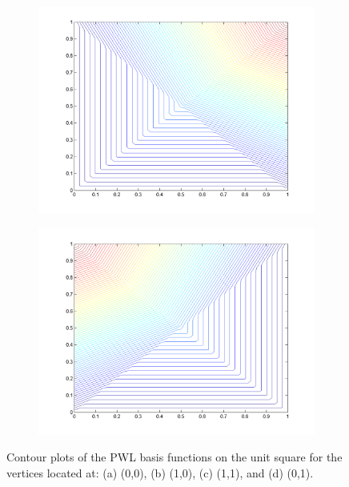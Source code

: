 \begin{figure}
\begin{subfigure}[b]{0.48\textwidth}
		\centering
		\includegraphics[width=\textwidth]{figures/sec_BF/PWL_square_contour_3.png}
		\caption{}
	\end{subfigure}
	\hfill
	\begin{subfigure}[b]{0.48\textwidth}
		\centering
		\includegraphics[width=\textwidth]{figures/sec_BF/PWL_square_contour_4.png}
		\caption{}
	\end{subfigure}
\caption{Contour plots of the PWL basis functions on the unit square for the vertices located at: (a) (0,0), (b) (1,0), (c) (1,1), and (d) (0,1).}
\end{figure}

